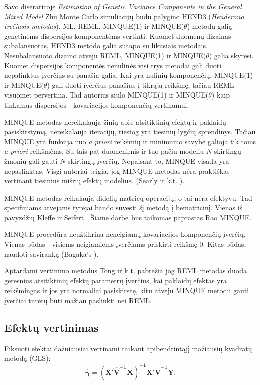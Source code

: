 \documentclass[11pt,a4paper]{article}
\begin{document}
Savo diseraticoje \textit{Estimation of Genetic Variance Components in the General Mixed Model}\cite{zhu} Zhu Monte Carlo simuliacijų būdu palygino HEND3 (\textit{Henderono trečiasis metodas}), ML, REML, MINQUE(1) ir MINQUE($\theta$) metodų galią genetinėms dispersijos komponentėms vertinti. Kuomet duomenų dizainas subalansuotas, HEND3 metodo galia sutapo su likusiais metodais. Nesubalansuoto dizaino atveju REML, MINQUE(1) ir MINQUE($\theta$) galia skyrėsi. Kuomet dispersijos komponentės nenulinės visi trys metodai gali duoti nepalinktus įverčius su panašia galia. Kai yra nulinių komponenčių, MINQUE(1) ir MINQUE($\theta$) gali duoti įverčius panašius į tikrąją reikšmę, tačiau REML visuomet pervertina. Tad autorius siūlo MINQUE(1) ir MINQUE($\theta$) kaip tinkamus dispersijos - kovariacijos komponenčių vertinumui.

\indent MINQUE metodas nereikalauja žinių apie atsitiktinių efektų ir paklaidų pasiskirstymą, nereikalauja iteracijų, tiesiog yra tiesinių lygčių sprendinys. Tačiau MINQUE yra funkcija nuo \textit{a priori} reikšmių ir minimumo savybė galioja tik toms \textit{a priori} reikšmėms. Su tais pat duomenimis ir tuo pačiu modeliu $N$ skirtingų žmonių gali gauti $N$ skirtingų įverčių. Nepaisant to, MINQUE visada yra nepaslinktas. Visgi autoriai teigia, jog MINQUE metodas nėra praktiškas vertinant tiesinius mišrių efektų modelius. (Searly ir k.t. \cite{minquereml2}).

\indent  MINQUE metodas reikalauja didelių matricų operacijų, o tai nėra efektyvu. Tad specifiniams atvejams tyrėjai bando suvesti šį metodą į bematricinį. Vienas iš pavyzdžių Kleffe ir Seifert \cite{papminque}. Šiame darbe bus taikomas paprastas Rao MINQUE.

\indent MINQUE procedūra neužtikrina neneigiamų kovariacijos komponenčių įverčių. Vienas būdas - visiems neigiamiems įverčiams priskirti reikšmę 0. Kitas būdas, naudoti saviranką (Bagaka's \cite{bagaka}).

\indent Aptardami vertinimo metodus Tong ir k.t.\cite{MLbetterMINQUE} pabrėžia jog REML metodas duoda geresnius atsitiktinių efektų parametrų įverčius, kai paklaidų efektas yra reikšmingas ir jos yra normaliai pasiskirstę, kitu atveju MINQUE metodu gauti įverčiai turėtų būti mažiau paslinkti nei REML.



\subsection{Efektų vertinimas}
\indent Fiksuoti efektai dažniausiai vertinami taikant apibendrintąjį mažiausių kvadratų metodą (GLS):
\begin{equation}\label{eq:gamma}
\boldsymbol{\hat{\gamma}}=\mathbf{\left(X'\hat{V}^{-1}X\right)^{-1}X'\hat{V}^{-1}Y}.
\end{equation}
\end{document}
